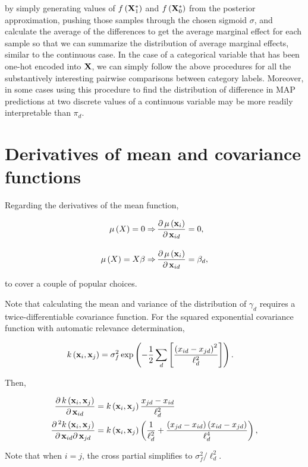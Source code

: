 \documentclass{draft}
\newcommand{\pd}{\ensuremath{\partial \,}}     %
\begin{document}
\noindent
by simply generating values of \( f \left( \mathbf{X}_1^\ast \right) \) and \( f \left( \mathbf{X}_0^\ast \right) \)
from the posterior approximation, pushing those samples through the chosen sigmoid \( \sigma \),
and calculate the average of the differences to get the average marginal effect for each sample
so that we can summarize the distribution of average marginal effects, similar to the continuous case.
In the case of a categorical variable that has been one-hot encoded into \( \mathbf{X} \),
we can simply follow the above procedures for all the substantively interesting pairwise comparisons between category labels.
Moreover, in some cases using this procedure to find the distribution of difference in MAP predictions at two discrete values
of a continuous variable may be more readily interpretable than \( \pi_d \).


\section{Derivatives of mean and covariance functions}

Regarding the derivatives of the mean function,

\begin{align}
    \mu \left( X \right) = 0 \Rightarrow \,
    &
    \dfrac{\pd \mu \left( \mbf{x}_i \right) }{\pd \mbf{x}_{id}} = 0, \\[1em]
    \mu \left( X \right) = X\beta \Rightarrow \,
    &
    \dfrac{\pd \mu \left( \mbf{x}_i \right) }{\pd \mbf{x}_{id}} = \beta_d,
\end{align}

\noindent
to cover a couple of popular choices.

Note that calculating the mean and variance of the distribution of \( \gamma_d \) requires a twice-differentiable covariance function.
For the squared exponential covariance function with automatic relevance determination,

\begin{align}
    k \left(\mathbf{x}_i, \mathbf{x}_j \right)
    & =
    \sigma_f^2 \exp \left( -\frac{1}{2} \sum_d \left[ \frac{\left(x_{id} - x_{jd}\right)^2}{\ell_d^2} \right] \right).
\end{align}

\noindent
Then, 

\begin{align}
    \dfrac{\pd k \left(\mbf{x}_i, \mbf{x}_j \right)}{\pd \mbf{x}_{id}}
    & = 
    k \left(\mbf{x}_i, \mbf{x}_j \right) \dfrac{x_{jd} - x_{id}}{\ell_d^2} \\
    \dfrac{\pd^2 k \left(\mbf{x}_{i}, \mbf{x}_{j} \right)}{\pd  \mbf{x}_{id} \pd \mbf{x}_{jd}}
    & =
    k \left(\mbf{x}_{i}, \mbf{x}_{j} \right)
    \left(
        \dfrac{1}{\ell_d^2} +
        \dfrac{\left( x_{jd} - x_{id} \right) \left( x_{id} - x_{jd} \right)}{\ell_d^4}
    \right),
\end{align}

Note that when \( i = j \), the cross partial simplifies to \( \sigma_f^2 / \ell_d^2 \).
\end{document}
